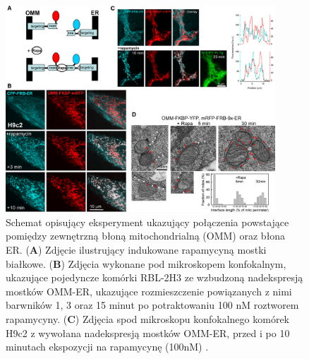 \begin{figure}[ht]
\centering
\includegraphics[width=0.9\textwidth]{rysunki/rozdzial_1/rapa.png}
\caption[Struktury spinające kompleksy mitochondrialno-retikularne]{Schemat opisujący eksperyment ukazujący połączenia powstające pomiędzy zewnętrzną błoną mitochondrialną (OMM) oraz błona ER. (\textbf{A}) Zdjęcie ilustrujący indukowane rapamycyną mostki białkowe. (\textbf{B}) Zdjęcia wykonane pod mikroskopem konfokalnym, ukazujące pojedyncze komórki RBL-2H3 ze wzbudzoną nadekspresją mostków OMM-ER, ukazujące rozmieszczenie powiązanych z nimi barwników 1, 3 oraz 15 minut po potraktowaniu 100 nM roztworem rapamycyny. (\textbf{C}) Zdjęcia spod mikroskopu konfokalnego komórek H9c2 z wywołana nadekspresją mostków OMM-ER, przed i po 10 minutach ekspozycji na rapamycynę (100nM) \cite{Csordas2010}.}
\label{fig:rapamycin}
\end{figure}

